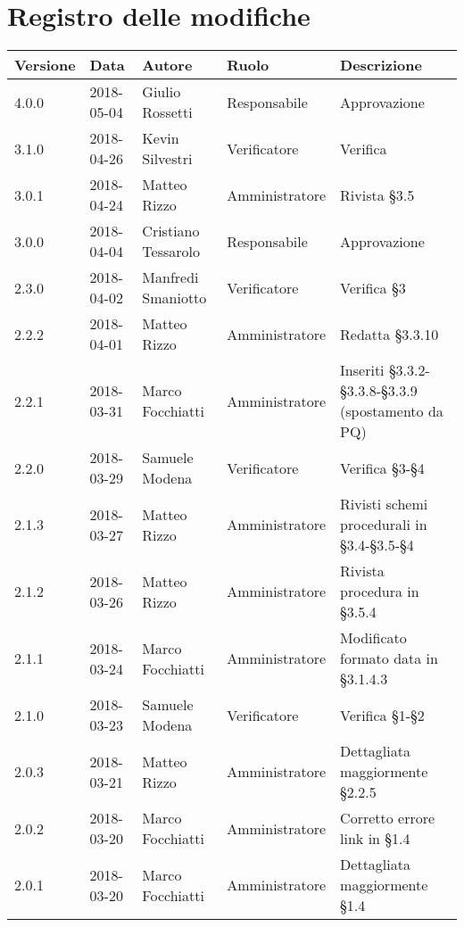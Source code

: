 \documentclass[./NormediProgetto.tex]{subfiles}
\begin{document}
\chapter*{Registro delle modifiche}
\setlength\LTleft{-22mm}
\begin{longtable}{|p{20mm}|p{20mm}|p{40mm}|p{30mm}|p{50mm}|}
	\hline
	\textbf{Versione} & \textbf{Data} & \textbf{Autore} & \textbf{Ruolo} & \textbf{Descrizione} \\ \hline 

		4.0.0 & 2018-05-04 & Giulio Rossetti & Responsabile & Approvazione\\ \hline
		3.1.0 & 2018-04-26 & Kevin Silvestri & Verificatore & Verifica\\ \hline
		3.0.1 & 2018-04-24 & Matteo Rizzo & Amministratore & Rivista §3.5\\ \hline
		3.0.0 & 2018-04-04 & Cristiano Tessarolo & Responsabile & Approvazione\\ \hline
		2.3.0 & 2018-04-02 & Manfredi Smaniotto & Verificatore &  Verifica §3\\ \hline
		2.2.2 & 2018-04-01 & Matteo Rizzo & Amministratore &  Redatta §3.3.10\\ \hline
		2.2.1 & 2018-03-31 & Marco Focchiatti & Amministratore &  Inseriti §3.3.2-§3.3.8-§3.3.9 (spostamento da PQ)\\ \hline
		2.2.0 & 2018-03-29 & Samuele Modena & Verificatore &  Verifica §3-§4\\ \hline
		2.1.3 & 2018-03-27 & Matteo Rizzo & Amministratore &  Rivisti schemi procedurali in §3.4-§3.5-§4\\ \hline
		2.1.2 & 2018-03-26 & Matteo Rizzo & Amministratore &  Rivista procedura in §3.5.4\\ \hline
		2.1.1 & 2018-03-24 & Marco Focchiatti & Amministratore &  Modificato formato data in §3.1.4.3\\ \hline
		2.1.0 & 2018-03-23 & Samuele Modena & Verificatore &  Verifica §1-§2\\ \hline
		2.0.3 & 2018-03-21 & Matteo Rizzo & Amministratore &  Dettagliata maggiormente §2.2.5\\ \hline
		2.0.2 & 2018-03-20 & Marco Focchiatti & Amministratore &  Corretto errore link in §1.4\\ \hline
		2.0.1 & 2018-03-20 & Marco Focchiatti & Amministratore &  Dettagliata maggiormente §1.4\\ 
		
		\hline
		

\end{longtable}
\end{document}
